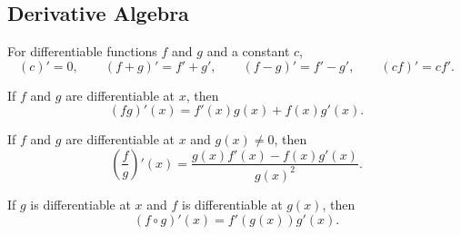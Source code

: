 \subsection*{Derivative Algebra}

\begin{theorem*}
For differentiable functions \(f\) and \(g\) and a constant \(c\),
\[
  (c)'=0,\qquad
  (f+g)'=f'+g',\qquad
  (f-g)'=f'-g',\qquad
  (cf)'=cf'.
\]
\end{theorem*}

\begin{theorem*}
If \(f\) and \(g\) are differentiable at \(x\), then
\[
  (fg)'(x)=f'(x)g(x)+f(x)g'(x).
\]
\end{theorem*}

\begin{theorem*}
If \(f\) and \(g\) are differentiable at \(x\) and \(g(x)\ne 0\), then
\[
  \left(\frac{f}{g}\right)'(x)
    =\frac{g(x)f'(x)-f(x)g'(x)}{g(x)^2}.
\]
\end{theorem*}

\begin{theorem*}
If \(g\) is differentiable at \(x\) and \(f\) is differentiable at \(g(x)\),
then
\[
  (f\circ g)'(x)=f'(g(x))g'(x).
\]
\end{theorem*}
